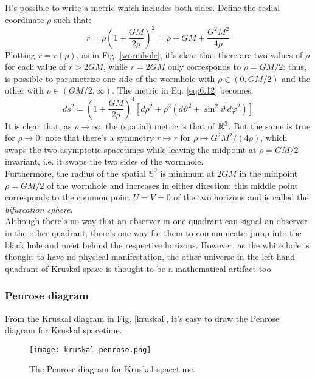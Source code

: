 It's possible to write a metric which includes both sides. Define the radial coordinate $ \rho $ such that:
\begin{equation*}
  r = \rho \left( 1 + \frac{GM}{2\rho} \right)^2 = \rho + GM + \frac{G^2 M^2}{4 \rho}
\end{equation*}
Plotting $ r = r(\rho) $, as in Fig. \ref{wormhole}, it's clear that there are two values of $ \rho $ for each value of $ r > 2GM $, while $ r = 2GM $ only corresponds to $ \rho = GM/2 $: thus, is possible to parametrize one side of the wormhole with $ \rho \in (0, GM/2) $ and the other with $ \rho \in (GM/2, \infty) $. The metric in Eq. \ref{eq:6.12} becomes:
\begin{equation}
  ds^2 = \left( 1 + \frac{GM}{2\rho} \right)^4 \left[ d\rho^2 + \rho^2 \left( d\vartheta^2 + \sin^2 \vartheta \, d\varphi^2 \right) \right]
  \label{eq:6.13}
\end{equation}
It is clear that, as $ \rho \rightarrow \infty $, the (spatial) metric is that of $ \mathbb{R}^3 $. But the same is true for $ \rho \rightarrow 0 $: note that there's a symmetry $ r \mapsto r $ for $ \rho \mapsto G^2 M^2 / (4\rho) $, which swaps the two asymptotic spacetimes while leaving the midpoint at $ \rho = GM/2 $ invariant, i.e. it swaps the two sides of the wormhole.\\
Furthermore, the radius of the spatial $ \mathbb{S}^2 $ is minimum at $ 2GM $ in the midpoint $ \rho = GM/2 $ of the wormhole and increases in either direction: this middle point corresponds to the common point $ U = V = 0 $ of the two horizons and is called the \textit{bifurcation sphere}.\\
Although there's no way that an observer in one quadrant can signal an observer in the other quadrant, there's one way for them to communicate: jump into the black hole and meet behind the respective horizons. However, as the white hole is thought to have no physical manifestation, the other universe in the left-hand quadrant of Kruskal space is thought to be a mathematical artifact too.

\subsubsection{Penrose diagram}

From the Kruskal diagram in Fig. \ref{kruskal}, it's easy to draw the Penrose diagram for Kruskal spacetime.

\begin{figure}
  \centering
  \texttt{[image: kruskal-penrose.png]}
  \caption{The Penrose diagram for Kruskal spacetime.}
  \label{kru-penr}
\end{figure}

